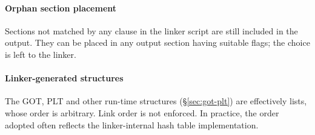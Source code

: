 
\paragraph{Orphan section placement}
Sections not matched by any clause in the linker script are still included in the output.
They can be placed in any output section having suitable flags; the choice is left to the linker.


\paragraph{Linker-generated structures}
The GOT, PLT and other run-time structures (\S\ref{sec:got-plt}) 
are effectively lists, whose order is arbitrary. 
Link order is not enforced.
In practice, the order adopted often reflects the linker-internal hash table implementation.

